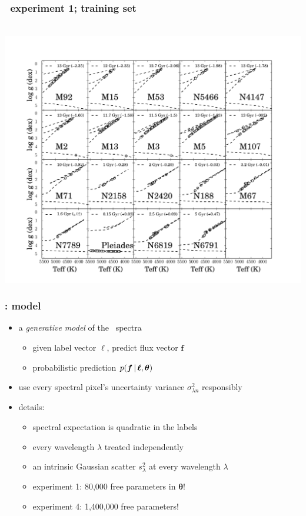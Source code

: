 \documentclass[pdftex]{beamer}
\begin{document}
\begin{frame}
  \frametitle{\tc\ experiment 1; training set}
  \,\hfill\includegraphics[height=\figureheight]{../documents/paper1/plots/training_mkn2.pdf}
\end{frame}

\newcommand{\flux}{f}
\newcommand{\fluxes}{\boldsymbol{\flux}}
\newcommand{\labels}{\boldsymbol{\ell}}
\newcommand{\pars}{\boldsymbol{\theta}}

\begin{frame}
  \frametitle{\tc: model}
  \begin{itemize}
  \item a \emph{generative model} of the \apogee\ spectra
    \begin{itemize}
    \item given label vector $\labels$, predict flux vector $\fluxes$
    \item probabilistic prediction $p(\fluxes\given\labels,\pars)$
    \end{itemize}
  \item use every spectral pixel's uncertainty variance $\sigma^2_{\lambda n}$ responsibly
  \item details:
    \begin{itemize}
    \item spectral expectation is quadratic in the labels
    \item every wavelength $\lambda$ treated independently
    \item an intrinsic Gaussian scatter $s^2_\lambda$ at every wavelength $\lambda$
    \item experiment 1: 80,000 free parameters in $\pars$!
    \item experiment 4: 1,400,000 free parameters!
    \end{itemize}
  \end{itemize}
\end{frame}
\end{document}
